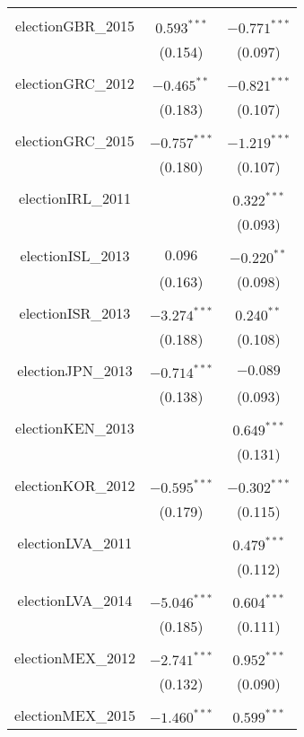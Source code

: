 \documentclass[12pt, titlepage]{article}
\begin{document}
\begin{table}[!htbp]
\begin{tabular}{@{\extracolsep{5pt}}ccc }
		& & \\ 
		electionGBR\_2015 & $0.593^{***}$ & $-0.771^{***}$ \\ 
		& (0.154) & (0.097) \\ 
		& & \\ 
		electionGRC\_2012 & $-0.465^{**}$ & $-0.821^{***}$ \\ 
		& (0.183) & (0.107) \\ 
		& & \\ 
		electionGRC\_2015 & $-0.757^{***}$ & $-1.219^{***}$ \\ 
		& (0.180) & (0.107) \\ 
		& & \\ 
		electionIRL\_2011 &  & $0.322^{***}$ \\ 
		&  & (0.093) \\ 
		& & \\ 
		electionISL\_2013 & $0.096$ & $-0.220^{**}$ \\ 
		& (0.163) & (0.098) \\ 
		& & \\ 
		electionISR\_2013 & $-3.274^{***}$ & $0.240^{**}$ \\ 
		& (0.188) & (0.108) \\ 
		& & \\ 
		electionJPN\_2013 & $-0.714^{***}$ & $-0.089 $\\ 
		& (0.138) & (0.093) \\ 
		& & \\ 
		electionKEN\_2013 &  & $0.649^{***}$\\ 
		&  & (0.131) \\ 
		& & \\ 
		electionKOR\_2012 & $-0.595^{***}$ & $-0.302^{***}$\\ 
		& (0.179) & (0.115) \\ 
		& & \\ 
		electionLVA\_2011 &  & $0.479^{***}$ \\ 
		&  & (0.112) \\ 
		& & \\ 
		electionLVA\_2014 & $-5.046^{***}$ & $0.604^{***} $\\ 
		& (0.185) & (0.111) \\ 
		& & \\ 
		electionMEX\_2012 & $-2.741^{***}$ & $0.952^{***}$ \\ 
		& (0.132) & (0.090) \\ 
		& & \\ 
		electionMEX\_2015 & $-1.460^{***}$ & $0.599^{***}$ \\ 

\end{tabular}
\end{table}
\end{document}
